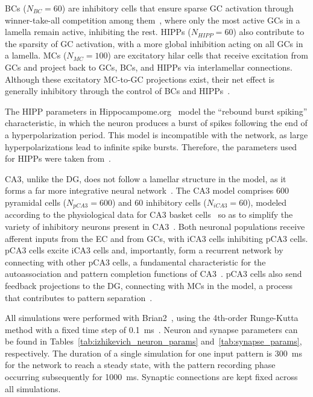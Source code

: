
BCs ($N_{BC} = 60$) are inhibitory cells that ensure sparse GC activation through winner-take-all competition among
them~\parencite{coultripCortical1992, chavlisDendrites2017, kimAdult2024}, where only the most active GCs in a lamella remain active,
inhibiting the rest. HIPPs ($N_{HIPP} = 60$) also contribute to the sparsity of GC activation, with a more global inhibition
acting on all GCs in a lamella. MCs ($N_{MC} = 100$) are excitatory hilar cells that receive excitation from GCs and project
back to GCs, BCs, and HIPPs via interlamellar connections. Although these excitatory MC-to-GC projections exist, their net
effect is generally inhibitory through the control of BCs and HIPPs~\parencite{myersRole2009, scharfmanHilar2013}.

The HIPP parameters in Hippocampome.org~\parencite{wheelerHippocampomeorg2023} model the ``rebound burst spiking'' characteristic,
in which the neuron produces a burst of spikes following the end of a hyperpolarization period. This model is incompatible with
the network, as large hyperpolarizations lead to infinite spike bursts. Therefore, the parameters used for HIPPs were taken
from~\textcite{modakIzhikevich2018}.


CA3, unlike the DG, does not follow a lamellar structure in the model, as it forms a far more integrative neural
network~\parencite{pakHippocampal2022, watsonHuman2025}. The CA3 model comprises 600 pyramidal cells ($N_{pCA3} = 600$) and 60
inhibitory cells ($N_{iCA3} = 60$), modeled according to the physiological data for CA3 basket cells~\parencite{wheelerHippocampomeorg2023}
so as to simplify the variety of inhibitory neurons present in CA3~\parencite{kopsickFormation2024}. Both neuronal populations
receive afferent inputs from the EC and from GCs, with iCA3 cells inhibiting pCA3 cells\@. pCA3 cells excite iCA3 cells and,
importantly, form a recurrent network by connecting with other pCA3 cells, a fundamental characteristic for the autoassociation
and pattern completion functions of CA3~\parencite{kopsickFormation2024, rollsMechanisms2013}\@. pCA3 cells also send feedback
projections to the DG, connecting with MCs in the model, a process that contributes to pattern
separation~\parencite{myersPattern2011}.

All simulations were performed with Brian2~\parencite{stimbergBrian2019a}, using the 4th-order Runge-Kutta method with a fixed time
step of \SI{0.1}{\milli\second}~\parencite{butcherHistory1996}. Neuron and synapse parameters can be found in
Tables~\ref{tab:izhikevich_neuron_params} and~\ref{tab:synapse_params}, respectively. The duration of a single simulation for
one input pattern is \SI{300}{\milli\second} for the network to reach a steady state, with the pattern recording phase
occurring subsequently for \SI{1000}{\milli\second}. Synaptic connections are kept fixed across all simulations.

